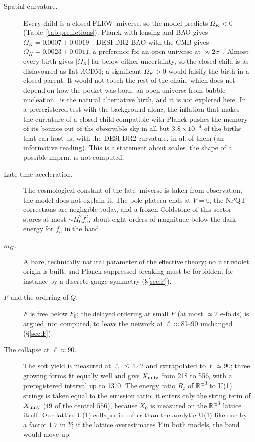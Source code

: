 \documentclass[11pt,a4paper]{article}
\newcommand{\RP}{\mathbb{RP}^3}
\newcommand{\Xu}{X_{\rm univ}}
\begin{document}
\begin{description}
\item[Spatial curvature.] Every child is a closed FLRW universe, so the model predicts $\Omega_K<0$ (Table~\ref{tab:predictions}). Planck with lensing and BAO gives $\Omega_K=0.0007\pm0.0019$~\cite{Planck2018X}; DESI DR2 BAO with the CMB gives $\Omega_K=0.0023\pm0.0011$, a preference for an open universe at $\approx2\sigma$~\cite{DESI2025DR2,ChenZaldarriaga2025}. Almost every birth gives $|\Omega_K|$ far below either uncertainty, so the closed child is as disfavoured as flat $\Lambda$CDM; a significant $\Omega_K>0$ would falsify the birth in a closed parent. It would not touch the rest of the chain, which does not depend on how the pocket was born: an open universe from bubble nucleation~\cite{ColemanDeLuccia1980,BucherGoldhaberTurok1995} is the natural alternative birth, and it is not explored here. In a preregistered test with the background alone, the inflation that makes the curvature of a closed child compatible with Planck pushes the memory of its bounce out of the observable sky in all but $3.8\times10^{-4}$ of the births that can host us; with the DESI DR2 curvature, in all of them (an informative reading). This is a statement about scales: the shape of a possible imprint is not computed.
\item[Late-time acceleration.] The cosmological constant of the late universe is taken from observation; the model does not explain it. The pole plateau ends at $V=0$, the NPQT corrections are negligible today, and a frozen Goldstone of this sector stores at most $\sim H_0^2f_a^2$, about eight orders of magnitude below the dark energy for $f_a$ in the band.
\item[$m_G$.] A bare, technically natural parameter of the effective theory; no ultraviolet origin is built, and Planck-suppressed breaking must be forbidden, for instance by a discrete gauge symmetry (\S\ref{sec:F}).
\item[$F$ and the ordering of $Q$.] $F$ is free below $F_0$; the delayed ordering at small $F$ (at most $\simeq2$ e-folds) is argued, not computed, to leave the network at $\ell\approx80$--$90$ unchanged (\S\ref{sec:F}).
\item[The collapse at $\ell\approx90$.] The soft yield is measured at $\ell_1\le4.42$ and extrapolated to $\ell\simeq90$; three growing forms fit equally well and give $\Xu$ from 218 to 556, with a preregistered interval up to 1370. The energy ratio $R_\rho$ of $\RP$ to U(1) strings is taken equal to the emission ratio; it enters only the string term of $\Xu$ ($49$ of the central $556$), because $X_0$ is measured on the $\RP$ lattice itself. Our lattice U(1) collapse is softer than the analytic U(1)-like one by a factor $1.7$ in $Y$; if the lattice overestimates $Y$ in both models, the band would move up.

\end{description}
\end{document}
